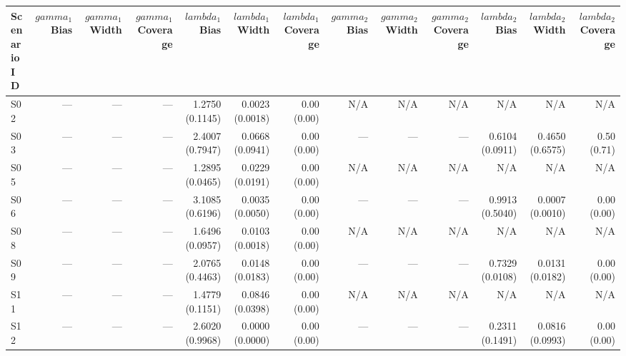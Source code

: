 \begin{tabular}{lrrrrrrrrrrrr}
\toprule
Scenario ID & $gamma_{1}$ Bias & $gamma_{1}$ Width & $gamma_{1}$ Coverage & $lambda_{1}$ Bias & $lambda_{1}$ Width & $lambda_{1}$ Coverage & $gamma_{2}$ Bias & $gamma_{2}$ Width & $gamma_{2}$ Coverage & $lambda_{2}$ Bias & $lambda_{2}$ Width & $lambda_{2}$ Coverage \\
\midrule
S02 & --- & --- & --- & 1.2750 (0.1145) & 0.0023 (0.0018) & 0.00 (0.00) & N/A & N/A & N/A & N/A & N/A & N/A \\
S03 & --- & --- & --- & 2.4007 (0.7947) & 0.0668 (0.0941) & 0.00 (0.00) & --- & --- & --- & 0.6104 (0.0911) & 0.4650 (0.6575) & 0.50 (0.71) \\
S05 & --- & --- & --- & 1.2895 (0.0465) & 0.0229 (0.0191) & 0.00 (0.00) & N/A & N/A & N/A & N/A & N/A & N/A \\
S06 & --- & --- & --- & 3.1085 (0.6196) & 0.0035 (0.0050) & 0.00 (0.00) & --- & --- & --- & 0.9913 (0.5040) & 0.0007 (0.0010) & 0.00 (0.00) \\
S08 & --- & --- & --- & 1.6496 (0.0957) & 0.0103 (0.0018) & 0.00 (0.00) & N/A & N/A & N/A & N/A & N/A & N/A \\
S09 & --- & --- & --- & 2.0765 (0.4463) & 0.0148 (0.0183) & 0.00 (0.00) & --- & --- & --- & 0.7329 (0.0108) & 0.0131 (0.0182) & 0.00 (0.00) \\
S11 & --- & --- & --- & 1.4779 (0.1151) & 0.0846 (0.0398) & 0.00 (0.00) & N/A & N/A & N/A & N/A & N/A & N/A \\
S12 & --- & --- & --- & 2.6020 (0.9968) & 0.0000 (0.0000) & 0.00 (0.00) & --- & --- & --- & 0.2311 (0.1491) & 0.0816 (0.0993) & 0.00 (0.00) \\
\bottomrule
\end{tabular}
